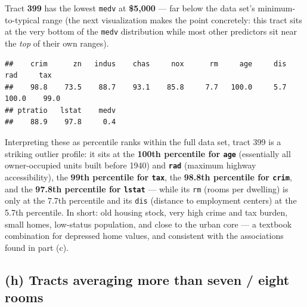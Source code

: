 \documentclass[
  11pt,
]{article}
\newenvironment{Shaded}{\begin{snugshade}}{\end{snugshade}}
\newcommand{\ControlFlowTok}[1]{\textcolor[rgb]{0.13,0.29,0.53}{\textbf{#1}}}
\newcommand{\DecValTok}[1]{\textcolor[rgb]{0.00,0.00,0.81}{#1}}
\newcommand{\FunctionTok}[1]{\textcolor[rgb]{0.13,0.29,0.53}{\textbf{#1}}}
\newcommand{\NormalTok}[1]{#1}
\newcommand{\OtherTok}[1]{\textcolor[rgb]{0.56,0.35,0.01}{#1}}
\newcommand{\SpecialCharTok}[1]{\textcolor[rgb]{0.81,0.36,0.00}{\textbf{#1}}}
\begin{document}
Tract \textbf{399} has the lowest \texttt{medv} at \textbf{\$5,000} ---
far below the data set's minimum-to-typical range (the next
visualization makes the point concretely: this tract sits at the very
bottom of the \texttt{medv} distribution while most other predictors sit
near the \emph{top} of their own ranges).

\begin{Shaded}
\end{Shaded}

\begin{verbatim}
##    crim      zn   indus    chas     nox      rm     age     dis     rad     tax 
##    98.8    73.5    88.7    93.1    85.8     7.7   100.0     5.7   100.0    99.0 
## ptratio   lstat    medv 
##    88.9    97.8     0.4
\end{verbatim}

Interpreting these as percentile ranks within the full data set, tract
399 is a striking outlier profile: it sits at the \textbf{100th
percentile for \texttt{age}} (essentially all owner-occupied units built
before 1940) and \textbf{\texttt{rad}} (maximum highway accessibility),
the \textbf{99th percentile for \texttt{tax}}, the \textbf{98.8th
percentile for \texttt{crim}}, and the \textbf{97.8th percentile for
\texttt{lstat}} --- while its \texttt{rm} (rooms per dwelling) is only
at the 7.7th percentile and its \texttt{dis} (distance to employment
centers) at the 5.7th percentile. In short: old housing stock, very high
crime and tax burden, small homes, low-status population, and close to
the urban core --- a textbook combination for depressed home values, and
consistent with the associations found in part (c).

\subsection{(h) Tracts averaging more than seven / eight
rooms}\label{h-tracts-averaging-more-than-seven-eight-rooms}
\end{document}
